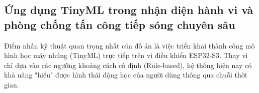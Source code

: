 


\iffalse
\subsection{Ứng dụng TinyML trong nhận diện hành vi và phòng chống tấn công tiếp sóng chuyên sâu}

Điểm nhấn kỹ thuật quan trọng nhất của đồ án là việc triển khai thành công mô hình học máy nhúng (TinyML) trực tiếp trên vi điều khiển ESP32-S3. Thay vì chỉ dựa vào các ngưỡng khoảng cách cố định (Rule-based), hệ thống hiện nay có khả năng "hiểu" được hình thái động học của người dùng thông qua chuỗi thời gian.

